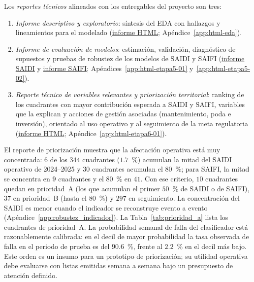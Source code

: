 Los \textit{reportes técnicos} alineados con los entregables del proyecto son tres:
\begin{enumerate}
    \item \textit{Informe descriptivo y exploratorio}: síntesis del EDA con hallazgos y lineamientos para el modelado (\href{\urlEDA}{informe HTML}; Apéndice~\ref{app:html-eda}).
    \item \textit{Informe de evaluación de modelos}: estimación, validación, diagnóstico de supuestos y pruebas de robustez de los modelos de SAIDI y SAIFI (\href{\urlEtapaCincoUno}{informe SAIDI} y \href{\urlEtapaCincoDos}{informe SAIFI}; Apéndices~\ref{app:html-etapa5-01} y~\ref{app:html-etapa5-02}).
    \item \textit{Reporte técnico de variables relevantes y priorización territorial}: ranking de los cuadrantes con mayor contribución esperada a SAIDI y SAIFI, variables que la explican y acciones de gestión asociadas (mantenimiento, poda e inversión), orientado al uso operativo y al seguimiento de la meta regulatoria (\href{\urlEtapaSeisUno}{informe HTML}; Apéndice~\ref{app:html-etapa6-01}).
\end{enumerate}

El reporte de priorización muestra que la afectación operativa está muy concentrada: $6$ de los $344$ cuadrantes ($1{.}7$~\%) acumulan la mitad del SAIDI operativo de 2024--2025 y $30$ cuadrantes acumulan el $80$~\%; para SAIFI, la mitad se concentra en $9$ cuadrantes y el $80$~\% en $41$. Con ese criterio, $10$ cuadrantes quedan en prioridad~A (los que acumulan el primer $50$~\% de SAIDI o de SAIFI), $37$ en prioridad~B (hasta el $80$~\%) y $297$ en seguimiento. La concentración del SAIDI es menor cuando el indicador se reconstruye evento a evento (Apéndice~\ref{app:robustez_indicador}). La Tabla~\ref{tab:prioridad_a} lista los cuadrantes de prioridad~A. La probabilidad semanal de falla del clasificador está razonablemente calibrada: en el decil de mayor probabilidad la tasa observada de falla en el periodo de prueba es del $90{.}6$~\%, frente al $2{.}2$~\% en el decil más bajo. Este orden es un insumo para un prototipo de priorización; su utilidad operativa debe evaluarse con listas emitidas semana a semana bajo un presupuesto de atención definido.

